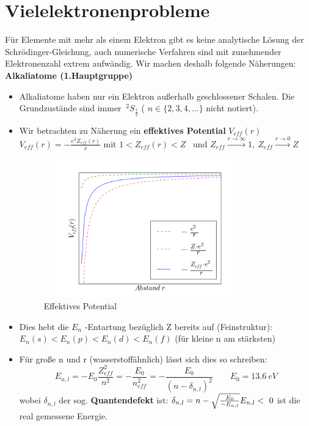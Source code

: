 \documentclass[Ex4_Zusammenfassung.tex]{subfiles}
\begin{document}
\section{Vielelektronenprobleme} 
Für Elemente mit mehr als einem Elektron gibt es keine analytische Lösung der Schrödinger-Gleichung, auch numerische Verfahren sind mit zunehmender Elektronenzahl extrem aufwändig. Wir machen deshalb folgende Näherungen:
\textbf{Alkaliatome (1.Hauptgruppe)} \newline 
\begin{itemize}
\item Alkaliatome haben nur ein Elektron außerhalb geschlossener Schalen. Die Grundzustände sind immer $ \ ^{2}S_{\frac{1}{2}} $ ( $ n  \in \{2,3,4,...\} $ nicht notiert).
\item Wir betrachten zu Näherung ein \textbf{effektives Potential} $ V_{eff}(r) $ \newline \newline
 $ V_{eff}(r) = - \frac{e^2 Z_{eff}(r)}{r} $ mit $ 1 < Z_{eff}(r) < Z $ \  und  $ Z_ {eff} \stackrel{r\rightarrow \infty}{\rightarrow} 1, \ Z_{eff} \stackrel{r \rightarrow 0}{\rightarrow} Z $
 
\begin{figure}[h]
\includegraphics[height= 6cm, width=9cm]{effpot.png}
\caption{ Effektives Potential }
\end{figure}
 \item Dies hebt die $ E_n $ -Entartung bezüglich Z bereits auf (Feinstruktur): \newline
$ E_n(s) < E_n(p) < E_n(d) < E_n(f)$ (für kleine n am stärksten)
\item Für große n und r (wasserstoffähnlich) lässt sich dies so schreiben: 
 	\begin{equation}
 	E_{n,l} = -E_0 \frac{Z_{eff}^2}{n^2} = - \frac{E_0}{n_{eff}^2} = - \frac{E_0}{(n-\delta_{n,l})^2} 			\qquad E_0 = 13.6 \  eV 
 	\end{equation}
 wobei $\delta_{n,l} $ der sog. \textbf{Quantendefekt} ist: $ \delta_{n,l} = n - \sqrt{\frac{E_0}{-E_{n,l}}} \newline  E_{n,l} <\  0  $ ist die real gemessene Energie. 

\end{itemize}
\end{document}
